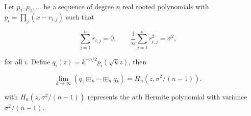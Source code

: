 \begin{theorem}
    Let $p_1, p_2, \dots$ be a sequence of degree $n$ real rooted polynomials with $p_i = \prod_j (x - r_{i,j})$ such that

    \begin{equation} \label{eq:hypotheses_ffclt}
        \sum_{j=1}^n r_{i,j} = 0, \qquad \frac1n \sum_{j=1}^n r^2_{i,j} = \sigma^2,
    \end{equation}

    \noindent for all $i$. Define $q_i(z) = k^{-n/2}p_i(\sqrt{k}z)$, then 


    \begin{equation*}
        \lim_{k\to\infty} \left( q_1 \boxplus_n \cdots \boxplus_n q_k \right) = H_n(z,\sigma^2/(n-1)).
    \end{equation*}

    \noindent with $H_n(z,\sigma^2/(n-1))$ represents the $n$th Hermite polynomial with variance $\sigma^2/(n-1)$.
\end{theorem}


